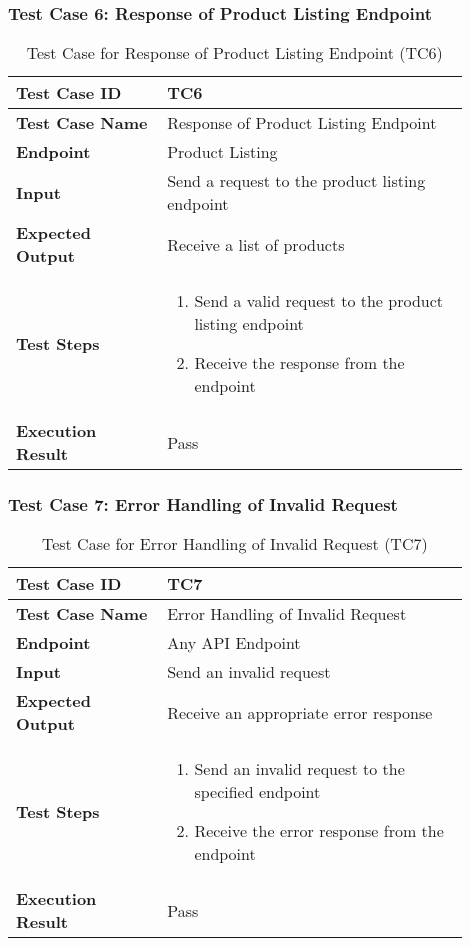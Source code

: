 \begin{table}[h]
	\subsubsection{Test Case 6: Response of Product Listing Endpoint}
	\centering
	\caption{Test Case for Response of Product Listing Endpoint (TC6)}
	\begin{tabular}{|p{0.3\linewidth}|p{0.6\linewidth}|}
		\hline
		\textbf{Test Case ID} & TC6 \\
		\hline
		\textbf{Test Case Name} & Response of Product Listing Endpoint \\
		\hline
		\textbf{Endpoint} & Product Listing \\
		\hline
		\textbf{Input} & Send a request to the product listing endpoint \\
		\hline
		\textbf{Expected Output} & Receive a list of products \\
		\hline
		\textbf{Test Steps} & \begin{enumerate}
			\item Send a valid request to the product listing endpoint 
			\item Receive the response from the endpoint 
		\end{enumerate}\\
		\hline
		\textbf{Execution Result} & Pass \\
		\hline
	\end{tabular}
\end{table}


\begin{table}[h]
	\subsubsection{Test Case 7: Error Handling of Invalid Request}
	\centering
	\caption{Test Case for Error Handling of Invalid Request (TC7)}
	\begin{tabular}{|p{0.3\linewidth}|p{0.6\linewidth}|}
		\hline
		\textbf{Test Case ID} & TC7 \\
		\hline
		\textbf{Test Case Name} & Error Handling of Invalid Request \\
		\hline
		\textbf{Endpoint} & Any API Endpoint \\
		\hline
		\textbf{Input} & Send an invalid request \\
		\hline
		\textbf{Expected Output} & Receive an appropriate error response \\
		\hline
		\textbf{Test Steps} & \begin{enumerate}
			\item Send an invalid request to the specified endpoint
			\item Receive the error response from the endpoint
		\end{enumerate} \\
		\hline
		\textbf{Execution Result} & Pass \\
		\hline
	\end{tabular}
\end{table}


